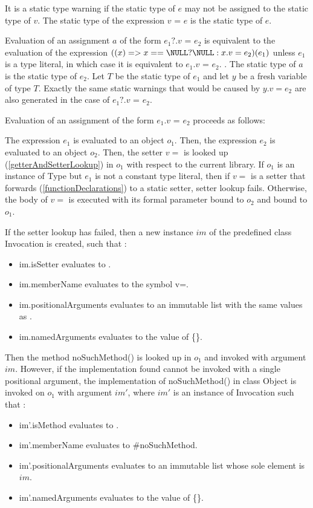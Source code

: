 \documentclass{article}
\newcommand{\code}[1]{{\sf #1}}
\begin{document}
\LMHash{}
It is a static type warning if the static type of $e$ may not be assigned to the static type of $v$. The static type of the expression $v$ \code{=} $e$ is the static type of $e$.

\LMHash{}
Evaluation of an assignment $a$ of the form $e_1?.v$ \code{=} $e_2$ is equivalent to the evaluation of the expression $((x) => x == \NULL? \NULL: x.v = e_2)(e_1)$
 unless $e_1$ is  a type literal, in which case it is equivalent to $e_1.v$ \code{=} $e_2$.
. The static type of $a$ is the static type of $e_2$. Let $T$ be the static type of $e_1$ and let $y$ be a fresh variable of type $T$. Exactly the same static warnings that would be caused by $y.v = e_2$ are also generated in the case of $e_1?.v$ \code{=} $e_2$.

\LMHash{}
Evaluation of an assignment of the form $e_1.v$ \code{=} $e_2$ proceeds as follows:

\LMHash{}
The expression $e_1$ is evaluated to an object $o_1$. Then, the expression $e_2$  is evaluated to an object $o_2$. Then, the setter $v=$ is looked up (\ref{getterAndSetterLookup}) in $o_1$ with respect to the current library.  If $o_1$ is an instance of \code{Type} but $e_1$ is not a constant type literal, then if $v=$ is a setter that forwards (\ref{functionDeclarations}) to a static setter, setter lookup fails. Otherwise, the body  of $v=$ is executed with its formal parameter bound to $o_2$ and \THIS{} bound to $o_1$.

\LMHash{}
If the setter lookup has failed, then a new instance $im$  of the predefined class  \code{Invocation}  is created, such that :
\begin{itemize}
\item  \code{im.isSetter} evaluates to \code{\TRUE{}}.
\item  \code{im.memberName} evaluates to the symbol \code{v=}.
\item \code{im.positionalArguments} evaluates to an immutable list with the same values as \code{[$o_2$]}.
\item \code{im.namedArguments} evaluates to the value of \code{\CONST{} \{\}}.
\end{itemize}

\LMHash{}
Then the method \code{noSuchMethod()} is looked up in $o_1$ and invoked  with argument $im$.
However, if the implementation found cannot be invoked with a single positional argument, the implementation  of \code{noSuchMethod()} in class \code{Object} is invoked on $o_1$ with argument $im'$, where $im'$ is an instance of \code{Invocation} such that :
\begin{itemize}
\item  \code{im'.isMethod} evaluates to \code{\TRUE{}}.
\item  \code{im'.memberName} evaluates to \code{\#noSuchMethod}.
\item \code{im'.positionalArguments} evaluates to an immutable list whose sole element is  $im$.
\item \code{im'.namedArguments} evaluates to the value of \code{\CONST{} \{\}}.
\end{itemize}
\end{document}
